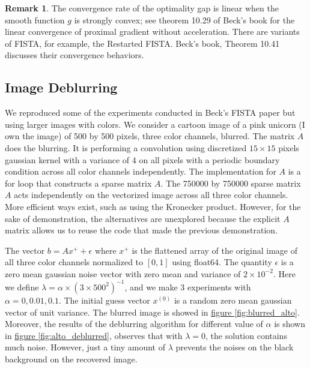 \documentclass[]{article}
\theoremstyle{definition}
\newtheorem{remark}{Remark}[subsection]
{
    \newtheorem{assumption}{Assumption}
}
\begin{document}
        \begin{remark}
            The convergence rate of the optimality gap is linear when the smooth function $g$ is strongly convex; see theorem 10.29 of Beck's book\cite{book:first_order_opt} for the linear convergence of proximal gradient without acceleration. There are variants of FISTA, for example, the Restarted FISTA. Beck's book, Theorem 10.41 \cite{book:first_order_opt} discusses their convergence behaviors.
        \end{remark}
        
    \subsection*{Image Deblurring}
        We reproduced some of the experiments conducted in Beck's FISTA paper \cite{paper:FISTA} but using larger images with colors. We consider a cartoon image of a pink unicorn (I own the image) of 500 by 500 pixels, three color channels, blurred. The matrix $A$ does the blurring. It is performing a convolution using discretized $15\times 15$ pixels gaussian kernel with a variance of $4$ on all pixels with a periodic boundary condition across all color channels independently. The implementation for $A$ is a for loop that constructs a sparse matrix $A$. The 750000 by 750000 sparse matrix $A$ acts independently on the vectorized image across all three color channels. More efficient ways exist, such as using the Kronecker product. However, for the sake of demonstration, the alternatives are unexplored because the explicit $A$ matrix allows us to reuse the code that made the previous demonstration. 
        \par
        The vector $b = Ax^+ + \epsilon$ where $x^+$ is the flattened array of the original image of all three color channels normalized to $[0, 1]$ using float64. The quantity $\epsilon$ is a zero mean gaussian noise vector with zero mean and variance of $2\times 10^{-2}$. Here we define $\lambda = \alpha\times (3\times500^2)^{-1}$, and we make 3 experiments with $\alpha = 0, 0.01, 0.1$. The initial guess vector $x^{(0)}$ is a random zero mean gaussian vector of unit variance. The blurred image is showed in \hyperref[fig:blurred_alto]{figure \ref*{fig:blurred_alto}}. Moreover, the results of the deblurring algorithm for different value of $\alpha$ is shown in \hyperref[fig:alto_deblurred]{figure \ref*{fig:alto_deblurred}}, observes that with $\lambda = 0$, the solution contains much noise. However, just a tiny amount of $\lambda$ prevents the noises on the black background on the recovered image. 
\end{document}
